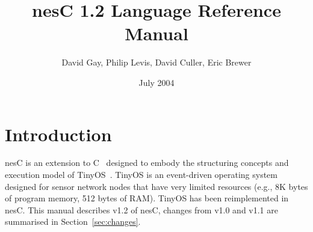 \documentclass[11pt,letterpaper]{article}
\newcommand{\nesc}{nesC\xspace}
\newcommand{\tinyos}{TinyOS\xspace}
\begin{document}
\title{\nesc 1.2 Language Reference Manual}
\author{David Gay, Philip Levis, David Culler, Eric Brewer}
\date{July 2004}

\maketitle

\section{Introduction}

\nesc is an extension to C~\cite{kandr} designed to embody the structuring
concepts and execution model of \tinyos~\cite{tinyos}. \tinyos is an
event-driven operating system designed for sensor network nodes that have
very limited resources (e.g., 8K bytes of program memory, 512 bytes of
RAM). \tinyos has been reimplemented in \nesc. This manual describes v1.2 of
\nesc, changes from v1.0 and v1.1 are summarised in Section~\ref{sec:changes}.
\end{document}
